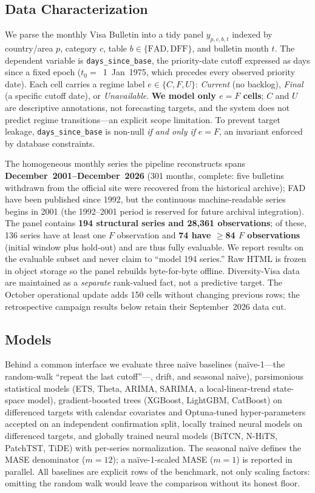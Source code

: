 \documentclass[runningheads]{llncs}
\begin{document}
\subsection{Data Characterization}
\label{sec:data}

We parse the monthly Visa Bulletin into a tidy panel $y_{p,c,b,t}$ indexed by
country/area $p$, category $c$, table $b\in\{\mathrm{FAD},\mathrm{DFF}\}$, and
bulletin month $t$. The dependent variable is \texttt{days\_since\_base}, the
priority-date cutoff expressed as days since a fixed epoch ($t_0=$~1~Jan~1975, which
precedes every observed priority date). Each cell carries a regime label
$e\in\{C,F,U\}$: \emph{Current} (no backlog), \emph{Final} (a specific cutoff
date), or \emph{Unavailable}. \textbf{We model only $e=F$ cells}; $C$ and $U$ are
descriptive annotations, not forecasting targets, and the system does not predict
regime transitions---an explicit scope limitation. To prevent target leakage,
\texttt{days\_since\_base} is non-null \emph{if and only if} $e=F$, an invariant
enforced by database constraints.

The homogeneous monthly series the pipeline reconstructs spans
\textbf{December~2001--December~2026} (301 months, complete: five bulletins withdrawn from
the official site were recovered from the historical archive); FAD have been
published since 1992, but the continuous machine-readable series begins in 2001
(the 1992--2001 period is reserved for future archival integration). The panel contains
\textbf{194 structural series and 28{,}361 observations}; of these, 136 series have
at least one $F$ observation and \textbf{74 have $\geq$84 $F$ observations}
(initial window plus hold-out) and are thus fully evaluable. We report results on
the evaluable subset and never claim to ``model 194 series.'' Raw HTML is frozen in
object storage so the panel rebuilds byte-for-byte offline. Diversity-Visa data are
maintained as a \emph{separate} rank-valued fact, not a predictive target.
The October operational update adds 150 cells without changing previous rows;
the retrospective campaign results below retain their September~2026 data cut.

\subsection{Models}
\label{sec:models}

Behind a common interface we evaluate three naïve baselines (naïve-1---the
random-walk ``repeat the last cutoff''---, drift, and seasonal naïve), parsimonious
statistical models (ETS, Theta, ARIMA, SARIMA, a local-linear-trend state-space
model), gradient-boosted trees (XGBoost, LightGBM, CatBoost) on differenced targets
with calendar covariates and Optuna-tuned hyper-parameters accepted on an
independent confirmation split, locally trained neural models on differenced
targets, and globally trained neural models (BiTCN, N-HiTS, PatchTST, TiDE) with
per-series normalization. The seasonal naïve defines the MASE denominator
($m=12$); a naïve-1-scaled MASE ($m=1$) is reported in parallel. All baselines are
explicit rows of the benchmark, not only scaling factors: omitting the random walk
would leave the comparison without its honest floor.
\end{document}
